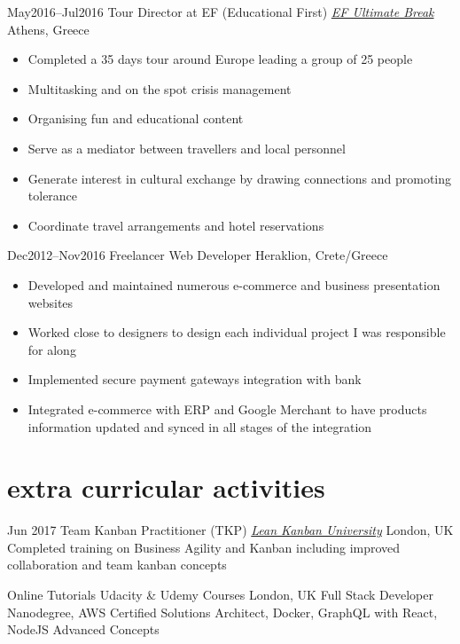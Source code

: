 \begin{entrylist}
\entry
{May2016–Jul2016}
{Tour Director at EF (Educational First)  {\normalfont \emph{\href{https://www.efultimatebreak.com/}{EF Ultimate Break}}}}
{Athens, Greece}
\vspace{-0.6cm}
\begin{itemize}[leftmargin=.6cm]	
	\item Completed a 35 days tour around Europe leading a group of 25 people
	\item Multitasking and on the spot crisis management
	\item Organising fun and educational content
	\item Serve as a mediator between travellers and local personnel
	\item Generate interest in cultural exchange by drawing connections and promoting tolerance
	\item Coordinate travel arrangements and hotel reservations
\end{itemize}

\entry
{Dec2012–Nov2016}
{Freelancer Web Developer}
{Heraklion, Crete/Greece}
\vspace{-0.6cm}
\begin{itemize}[leftmargin=.6cm]
	\item Developed and maintained numerous e-commerce and business presentation websites
	\item Worked close to designers to design each individual project I was responsible for along
	\item Implemented secure payment gateways integration with bank
	\item Integrated e-commerce with ERP and Google Merchant to have products information updated and synced in all stages of the integration
\end{itemize}

\end{entrylist}

\section{\normalfont extra curricular activities}
\begin{entrylist}

\entry
{Jun 2017}
 {Team Kanban Practitioner (TKP) {\normalfont \emph{\href{https://edu.leankanban.com/}{Lean Kanban University}}}} 
{London, UK} 
{Completed training on Business Agility and Kanban including improved collaboration and team kanban concepts}

\entry
{Online Tutorials}
 {Udacity \& Udemy Courses}
{London, UK} 
{Full Stack Developer Nanodegree, AWS Certified Solutions Architect, Docker, GraphQL with React, NodeJS Advanced Concepts}


\end{entrylist}